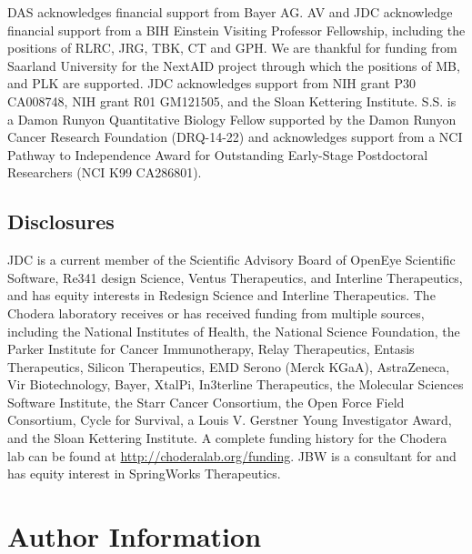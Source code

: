 \documentclass[9pt,lessons, pubversion]{livecoms}
\begin{document}
DAS acknowledges financial support from Bayer AG. AV and JDC acknowledge financial support from a BIH Einstein Visiting Professor Fellowship, including the positions of RLRC, JRG, TBK, CT and GPH. We are thankful for funding from Saarland University for the NextAID project through which the positions of MB, and PLK are supported. JDC acknowledges support from NIH grant P30 CA008748, NIH grant R01 GM121505, and the Sloan Kettering Institute.  S.S. is a Damon Runyon Quantitative Biology Fellow supported by the Damon Runyon Cancer Research Foundation (DRQ-14-22) and acknowledges support from a NCI Pathway to Independence Award for Outstanding Early-Stage Postdoctoral Researchers (NCI K99 CA286801).

\subsection{Disclosures}

JDC is a current member of the Scientific Advisory Board of OpenEye Scientific Software, Re341 design Science, Ventus Therapeutics, and Interline Therapeutics, and has equity interests in Redesign Science and Interline Therapeutics. The Chodera laboratory receives or has received funding from multiple sources, including the National Institutes of Health, the National Science Foundation, the Parker Institute for Cancer Immunotherapy, Relay Therapeutics, Entasis Therapeutics, Silicon Therapeutics, EMD Serono (Merck KGaA), AstraZeneca, Vir Biotechnology, Bayer, XtalPi, In3terline Therapeutics, the Molecular Sciences Software Institute, the Starr Cancer Consortium, the Open Force Field Consortium, Cycle for Survival, a Louis V. Gerstner Young Investigator Award, and the Sloan Kettering Institute. A complete funding history for the Chodera lab can be found at
\url{http://choderalab.org/funding}. JBW is a consultant for and has equity interest in SpringWorks Therapeutics.


\section*{Author Information}
\makeorcid
\nolinenumbers %

\linenumbers


\appendix
\end{document}

